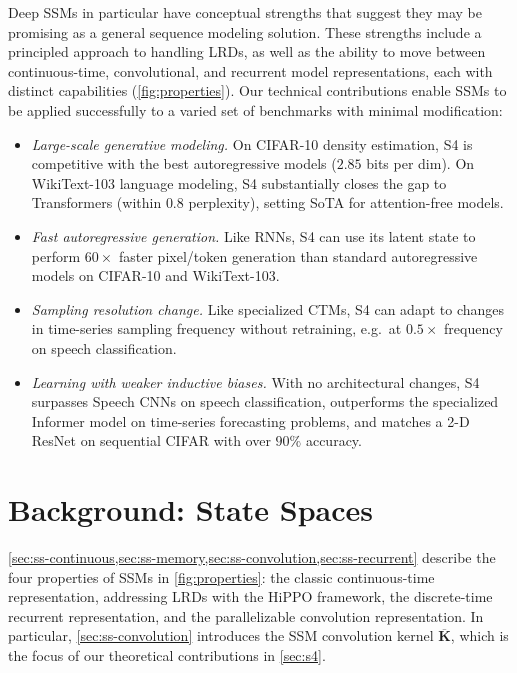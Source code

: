 Deep SSMs in particular have conceptual strengths that suggest they may be promising as a general sequence modeling solution. These strengths include a principled approach to handling LRDs, as well as the ability to move between continuous-time, convolutional, and recurrent model representations, each with distinct capabilities (\ref{fig:properties}). 
Our technical contributions enable SSMs to be applied successfully to a varied set of benchmarks with minimal modification:

\begin{itemize}[leftmargin=*]
    \item {\it Large-scale generative modeling.} On CIFAR-10 density estimation, S4 is competitive with the best autoregressive models ($2.85$ bits per dim). On WikiText-103 language modeling, S4 substantially closes the gap to Transformers (within $0.8$ perplexity), setting SoTA for attention-free models.
    \item {\it Fast autoregressive generation.} Like RNNs, S4 can use its latent state to perform $60\times$ faster pixel/token generation than standard autoregressive models on CIFAR-10 and WikiText-103.
    \item {\it Sampling resolution change.} Like specialized CTMs, S4 can adapt to changes in time-series sampling frequency without retraining, e.g.\ at $0.5\times$ frequency on speech classification.
    \item {\it Learning with weaker inductive biases.} With no architectural changes, S4 surpasses Speech CNNs on speech classification, outperforms the specialized Informer model on time-series forecasting problems, and matches a 2-D ResNet on sequential CIFAR with over $90\%$ accuracy.

\end{itemize}

\section{Background: State Spaces}
\label{sec:background}

\ref{sec:ss-continuous,sec:ss-memory,sec:ss-convolution,sec:ss-recurrent} describe the four properties of SSMs in \ref{fig:properties}:
the classic continuous-time representation, addressing LRDs with the HiPPO framework, the discrete-time recurrent representation, and the parallelizable convolution representation. In particular, \ref{sec:ss-convolution} introduces the SSM convolution kernel $\bm{\overline{K}}$,
which is the focus of our theoretical contributions in \ref{sec:s4}.

